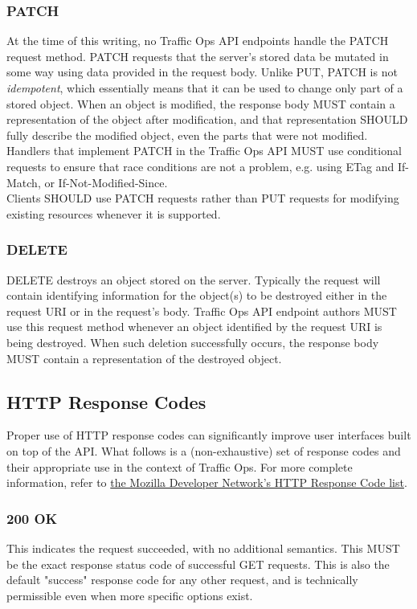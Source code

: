 \documentclass{article}
\begin{document}
\subsubsection{PATCH}
At the time of this writing, no Traffic Ops API endpoints handle the PATCH request method. PATCH requests that the server's stored data be mutated
in some way using data provided in the request body. Unlike PUT, PATCH is not \emph{idempotent}, which essentially means that it can be used to
change only part of a stored object. When an object is modified, the response body MUST contain a representation of the object after modification,
and that representation SHOULD fully describe the modified object, even the parts that were not modified.\\
Handlers that implement PATCH in the Traffic Ops API MUST use conditional requests to ensure that race conditions are not a problem, e.g. using
ETag and If-Match, or If-Not-Modified-Since.\\
Clients SHOULD use PATCH requests rather than PUT requests for modifying existing resources whenever it is supported.

\subsubsection{DELETE}
DELETE destroys an object stored on the server. Typically the request will contain identifying information for the object(s) to be destroyed either
in the request URI or in the request's body. Traffic Ops API endpoint authors MUST use this request method whenever an object identified by the
request URI is being destroyed. When such deletion successfully occurs, the response body MUST contain a representation of the destroyed object.

\subsection{HTTP Response Codes}
Proper use of HTTP response codes can significantly improve user interfaces built on top of the API. What follows is a (non-exhaustive) set of
response codes and their appropriate use in the context of Traffic Ops. For more complete information, refer to
\href{https://developer.mozilla.org/en-US/docs/Web/HTTP/Status}{the Mozilla Developer Network's HTTP Response Code list}.

\subsubsection{200 OK}
This indicates the request succeeded, with no additional semantics. This MUST be the exact response status code of successful GET requests. This is
also the default "success" response code for any other request, and is technically permissible even when more specific options exist.
\end{document}
